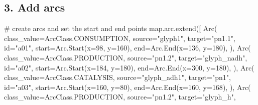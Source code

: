 \documentclass[
  letterpaper,
  DIV=11,
  numbers=noendperiod]{scrartcl}
\newenvironment{Shaded}{\begin{snugshade}}{\end{snugshade}}
\newcommand{\BuiltInTok}[1]{\textcolor[rgb]{0.00,0.23,0.31}{#1}}
\newcommand{\CommentTok}[1]{\textcolor[rgb]{0.37,0.37,0.37}{#1}}
\newcommand{\DecValTok}[1]{\textcolor[rgb]{0.68,0.00,0.00}{#1}}
\newcommand{\NormalTok}[1]{\textcolor[rgb]{0.00,0.23,0.31}{#1}}
\newcommand{\OperatorTok}[1]{\textcolor[rgb]{0.37,0.37,0.37}{#1}}
\newcommand{\StringTok}[1]{\textcolor[rgb]{0.13,0.47,0.30}{#1}}
\begin{document}
\subsection{3. Add arcs}\label{add-arcs}

\begin{Shaded}
\begin{Highlighting}[]
\CommentTok{\# create arcs and set the start and end points}
\BuiltInTok{map}\NormalTok{.arc.extend([}
\NormalTok{    Arc(}
\NormalTok{        class\_value}\OperatorTok{=}\NormalTok{ArcClass.CONSUMPTION,}
\NormalTok{        source}\OperatorTok{=}\StringTok{"glyph1"}\NormalTok{,}
\NormalTok{        target}\OperatorTok{=}\StringTok{"pn1.1"}\NormalTok{,}
        \BuiltInTok{id}\OperatorTok{=}\StringTok{"a01"}\NormalTok{,}
\NormalTok{        start}\OperatorTok{=}\NormalTok{Arc.Start(x}\OperatorTok{=}\DecValTok{98}\NormalTok{, y}\OperatorTok{=}\DecValTok{160}\NormalTok{),}
\NormalTok{        end}\OperatorTok{=}\NormalTok{Arc.End(x}\OperatorTok{=}\DecValTok{136}\NormalTok{, y}\OperatorTok{=}\DecValTok{180}\NormalTok{),}
\NormalTok{    ),}
\NormalTok{    Arc(}
\NormalTok{        class\_value}\OperatorTok{=}\NormalTok{ArcClass.PRODUCTION,}
\NormalTok{        source}\OperatorTok{=}\StringTok{"pn1.2"}\NormalTok{,}
\NormalTok{        target}\OperatorTok{=}\StringTok{"glyph\_nadh"}\NormalTok{,}
        \BuiltInTok{id}\OperatorTok{=}\StringTok{"a02"}\NormalTok{,}
\NormalTok{        start}\OperatorTok{=}\NormalTok{Arc.Start(x}\OperatorTok{=}\DecValTok{184}\NormalTok{, y}\OperatorTok{=}\DecValTok{180}\NormalTok{),}
\NormalTok{        end}\OperatorTok{=}\NormalTok{Arc.End(x}\OperatorTok{=}\DecValTok{300}\NormalTok{, y}\OperatorTok{=}\DecValTok{180}\NormalTok{),}
\NormalTok{    ),}
\NormalTok{    Arc(}
\NormalTok{        class\_value}\OperatorTok{=}\NormalTok{ArcClass.CATALYSIS,}
\NormalTok{        source}\OperatorTok{=}\StringTok{"glyph\_adh1"}\NormalTok{,}
\NormalTok{        target}\OperatorTok{=}\StringTok{"pn1"}\NormalTok{,}
        \BuiltInTok{id}\OperatorTok{=}\StringTok{"a03"}\NormalTok{,}
\NormalTok{        start}\OperatorTok{=}\NormalTok{Arc.Start(x}\OperatorTok{=}\DecValTok{160}\NormalTok{, y}\OperatorTok{=}\DecValTok{80}\NormalTok{),}
\NormalTok{        end}\OperatorTok{=}\NormalTok{Arc.End(x}\OperatorTok{=}\DecValTok{160}\NormalTok{, y}\OperatorTok{=}\DecValTok{168}\NormalTok{),}
\NormalTok{    ),}
\NormalTok{    Arc(}
\NormalTok{        class\_value}\OperatorTok{=}\NormalTok{ArcClass.PRODUCTION,}
\NormalTok{        source}\OperatorTok{=}\StringTok{"pn1.2"}\NormalTok{,}
\NormalTok{        target}\OperatorTok{=}\StringTok{"glyph\_h"}\NormalTok{,}

\end{Highlighting}
\end{Shaded}
\end{document}
